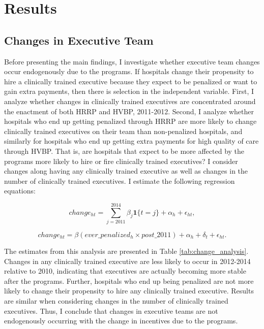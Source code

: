 \documentclass[12pt]{article}
\begin{document}
    \section{Results}

    \subsection{Changes in Executive Team}\label{sec:endog}

    Before presenting the main findings, I investigate whether executive team changes occur endogenously due to the programs. If hospitals change their propensity to hire a clinically trained executive because they expect to be penalized or want to gain extra payments, then there is selection in the independent variable. First, I analyze whether changes in clinically trained executives are concentrated around the enactment of both HRRP and HVBP, 2011-2012. Second, I analyze whether hospitals who end up getting penalized through HRRP are more likely to change clinically trained executives on their team than non-penalized hospitals, and similarly for hospitals who end up getting extra payments for high quality of care through HVBP. That is, are hospitals that expect to be more affected by the programs more likely to hire or fire clinically trained executives? I consider changes along having any clinically trained executive as well as changes in the number of clinically trained executives. I estimate the following regression equations:

    \begin{equation}
    change_{ht} = \sum_{j=2011}^{2014}\beta_j\mathbf{1}\{t=j\} + \alpha_h + \epsilon_{ht},
    \end{equation}

    \begin{equation}
    change_{ht} = \beta(ever\_penalized_{h} \times post\_2011)+ \alpha_h + \delta_t + \epsilon_{ht}.
    \end{equation}

    The estimates from this analysis are presented in Table \ref{tab:change_analysis}. Changes in any clinically trained executive are less likely to occur in 2012-2014 relative to 2010, indicating that executives are actually becoming more stable after the programs. Further, hospitals who end up being penalized are not more likely to change their propensity to hire any clinically trained executive. Results are similar when considering changes in the number of clinically trained executives. Thus, I conclude that changes in executive teams are not endogenously occurring with the change in incentives due to the programs. 
\end{document}
